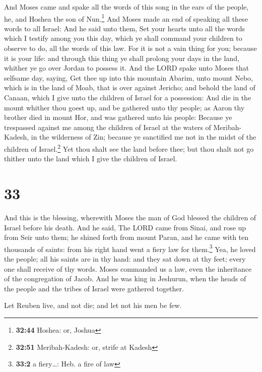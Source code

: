  And Moses came and spake all the words of this song in
the ears of the people, he, and Hoshea the son of Nun.\footnote{\textbf{32:44}
  Hoshea: or, Joshua}  And Moses made an end of speaking
all these words to all Israel:  And he said unto them,
Set your hearts unto all the words which I testify among you this day,
which ye shall command your children to observe to do, all the words of
this law.  For it is not a vain thing for you; because it
is your life: and through this thing ye shall prolong your days in the
land, whither ye go over Jordan to possess it.  And the
LORD spake unto Moses that selfsame day, saying,  Get
thee up into this mountain Abarim, unto mount Nebo, which is in the land
of Moab, that is over against Jericho; and behold the land of Canaan,
which I give unto the children of Israel for a possession:
 And die in the mount whither thou goest up, and be
gathered unto thy people; as Aaron thy brother died in mount Hor, and
was gathered unto his people:  Because ye trespassed
against me among the children of Israel at the waters of Meribah-Kadesh,
in the wilderness of Zin; because ye sanctified me not in the midst of
the children of Israel.\footnote{\textbf{32:51} Meribah-Kadesh: or,
  strife at Kadesh}  Yet thou shalt see the land before
thee; but thou shalt not go thither unto the land which I give the
children of Israel.

\hypertarget{section-32}{%
\section{33}\label{section-32}}

 And this is the blessing, wherewith Moses the man of God
blessed the children of Israel before his death.  And he
said, The LORD came from Sinai, and rose up from Seir unto them; he
shined forth from mount Paran, and he came with ten thousands of saints:
from his right hand went a fiery law for them.\footnote{\textbf{33:2} a
  fiery\ldots: Heb. a fire of law}  Yea, he loved the
people; all his saints are in thy hand: and they sat down at thy feet;
every one shall receive of thy words.  Moses commanded us
a law, even the inheritance of the congregation of Jacob. 
And he was king in Jeshurun, when the heads of the people and the tribes
of Israel were gathered together.

 Let Reuben live, and not die; and let not his men be few.

